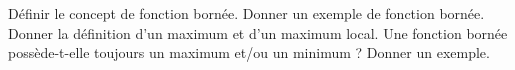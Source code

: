 %
%
	\begin{tasks}
		\task Définir le concept de fonction bornée.
		\task Donner un exemple de fonction bornée.
		\task Donner la définition d'un maximum et d'un maximum local.
		\task Une fonction bornée possède-t-elle toujours un maximum et/ou un minimum ? Donner un exemple.
	\end{tasks}
